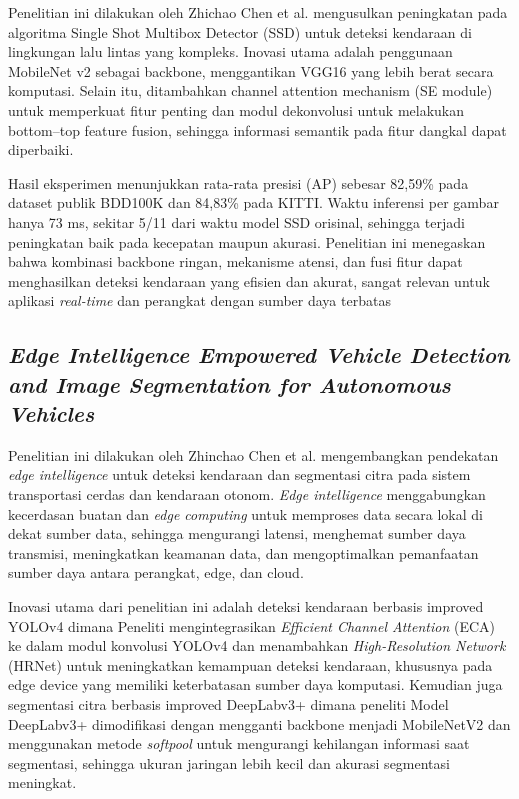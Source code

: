 Penelitian ini dilakukan oleh Zhichao Chen et al. \parencite*{Chen2022Fast} mengusulkan peningkatan pada algoritma Single Shot Multibox Detector (SSD) untuk deteksi kendaraan di lingkungan lalu lintas yang kompleks. Inovasi utama adalah penggunaan MobileNet v2 sebagai backbone, menggantikan VGG16 yang lebih berat secara komputasi. Selain itu, ditambahkan channel attention mechanism (SE module) untuk memperkuat fitur penting dan modul dekonvolusi untuk melakukan bottom–top feature fusion, sehingga informasi semantik pada fitur dangkal dapat diperbaiki.

Hasil eksperimen menunjukkan rata-rata presisi (AP) sebesar 82,59\% pada dataset publik BDD100K dan 84,83\% pada KITTI. Waktu inferensi per gambar hanya 73 ms, sekitar 5/11 dari waktu model SSD orisinal, sehingga terjadi peningkatan baik pada kecepatan maupun akurasi. Penelitian ini menegaskan bahwa kombinasi backbone ringan, mekanisme atensi, dan fusi fitur dapat menghasilkan deteksi kendaraan yang efisien dan akurat, sangat relevan untuk aplikasi \emph{real-time} dan perangkat dengan sumber daya terbatas

\subsection{\emph{Edge Intelligence Empowered Vehicle Detection and Image Segmentation for Autonomous Vehicles}}
\label{subsec:edgeintelligenceempoweredvehicledetection}

Penelitian ini dilakukan oleh Zhinchao Chen et al. \parencite*{Chen2023Edge}mengembangkan pendekatan \emph{edge intelligence} untuk deteksi kendaraan dan segmentasi citra pada sistem transportasi cerdas dan kendaraan otonom. \emph{Edge intelligence} menggabungkan kecerdasan buatan dan \emph{edge computing} untuk memproses data secara lokal di dekat sumber data, sehingga mengurangi latensi, menghemat sumber daya transmisi, meningkatkan keamanan data, dan mengoptimalkan pemanfaatan sumber daya antara perangkat, edge, dan cloud.

Inovasi utama dari penelitian ini adalah deteksi kendaraan berbasis improved YOLOv4 dimana Peneliti mengintegrasikan \emph{Efficient Channel Attention} (ECA) ke dalam modul konvolusi YOLOv4 dan menambahkan \emph{High-Resolution Network} (HRNet) untuk meningkatkan kemampuan deteksi kendaraan, khususnya pada edge device yang memiliki keterbatasan sumber daya komputasi. Kemudian juga segmentasi citra berbasis improved DeepLabv3+ dimana peneliti Model DeepLabv3+ dimodifikasi dengan mengganti backbone menjadi MobileNetV2 dan menggunakan metode \emph{softpool} untuk mengurangi kehilangan informasi saat segmentasi, sehingga ukuran jaringan lebih kecil dan akurasi segmentasi meningkat.

